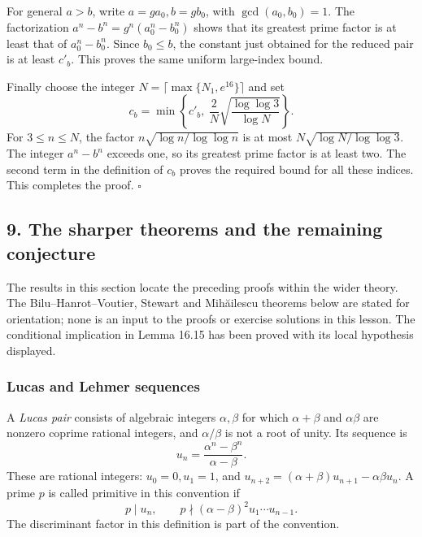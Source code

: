 \documentclass[
  11pt,
  a4paper,
]{article}
\begin{document}
For general \(a>b\), write \(a=ga_0,b=gb_0\), with \(\gcd(a_0,b_0)=1\).
The factorization \(a^n-b^n=g^n(a_0^n-b_0^n)\) shows that its greatest
prime factor is at least that of \(a_0^n-b_0^n\). Since \(b_0\le b\),
the constant just obtained for the reduced pair is at least \(c'_b\).
This proves the same uniform large-index bound.

Finally choose the integer \(N=\lceil\max\{N_1,e^{16}\}\rceil\) and set
\[
 c_b=\min\left\{c'_b,\
       \frac{2}{N}\sqrt{\frac{\log\log3}{\log N}}\right\}.
\] For \(3\le n\le N\), the factor \(n\sqrt{\log n/\log\log n}\) is at
most \(N\sqrt{\log N/\log\log3}\). The integer \(a^n-b^n\) exceeds one,
so its greatest prime factor is at least two. The second term in the
definition of \(c_b\) proves the required bound for all these indices.
This completes the proof. \(\square\)

\subsection{9. The sharper theorems and the remaining
conjecture}\label{the-sharper-theorems-and-the-remaining-conjecture}

The results in this section locate the preceding proofs within the wider
theory. The Bilu--Hanrot--Voutier, Stewart and Mihăilescu theorems below
are stated for orientation; none is an input to the proofs or exercise
solutions in this lesson. The conditional implication in Lemma 16.15 has
been proved with its local hypothesis displayed.

\subsubsection{Lucas and Lehmer
sequences}\label{lucas-and-lehmer-sequences}

A \emph{Lucas pair} consists of algebraic integers \(\alpha,\beta\) for
which \(\alpha+\beta\) and \(\alpha\beta\) are nonzero coprime rational
integers, and \(\alpha/\beta\) is not a root of unity. Its sequence is
\[
 u_n=\frac{\alpha^n-\beta^n}{\alpha-\beta}.
 \tag{16.101}
\] These are rational integers: \(u_0=0,u_1=1\), and
\(u_{n+2}=(\alpha+\beta)u_{n+1}-\alpha\beta u_n\). A prime \(p\) is
called primitive in this convention if \[
 p\mid u_n,\qquad
 p\nmid(\alpha-\beta)^2u_1\cdots u_{n-1}.
 \tag{16.102}
\] The discriminant factor in this definition is part of the convention.
\end{document}
